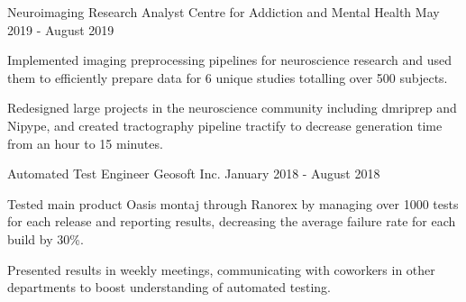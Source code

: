 

\begin{cventries}

  \cventry
    {Neuroimaging Research Analyst} %
    {Centre for Addiction and Mental Health} %
    {} %
    {May 2019 - August 2019} %
    {
      \begin{cvitems} %
        \item {Implemented imaging preprocessing pipelines for neuroscience research and used them to efficiently prepare data for 6 unique studies totalling over 500 subjects.}
        \item {Redesigned large projects in the neuroscience community including dmriprep and Nipype, and created tractography pipeline tractify to decrease generation time from an hour to 15 minutes.}
      \end{cvitems}
    }

  \cventry
    {Automated Test Engineer} %
    {Geosoft Inc.} %
    {} %
    {January 2018 - August 2018} %
    {
      \begin{cvitems} %
        \item {Tested main product Oasis montaj through Ranorex by managing over 1000 tests for each release and reporting results, decreasing the average failure rate for each build by 30\%.}
        \item {Presented results in weekly meetings, communicating with coworkers in other departments to boost understanding of automated testing.}
      \end{cvitems}
    }

\end{cventries}
